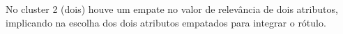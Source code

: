 No cluster 2 (dois) houve um empate no valor de relevância de dois atributos, implicando na escolha dos dois atributos empatados para integrar o rótulo.
% 
%  
